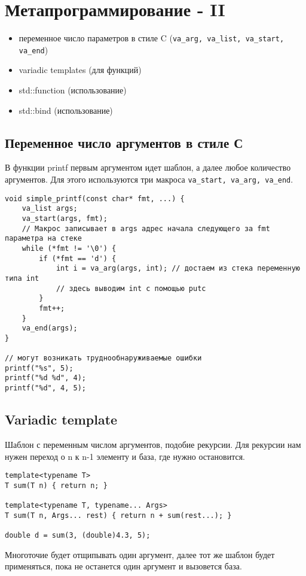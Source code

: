 \section{Метапрограммирование - II}
\begin{itemize}[noitemsep]
	\item переменное число параметров в стиле C (\texttt{va\_arg, va\_list, va\_start, va\_end})
	\item variadic templates (для функций)
	\item std::function (использование)
	\item std::bind (использование)
\end{itemize}

\subsection{Переменное число аргументов в стиле С}
В функции printf первым аргументом идет шаблон, а далее любое количество аргументов. 
Для этого используются три макроса \texttt{va\_start, va\_arg, va\_end}. 
\begin{verbatim}
void simple_printf(const char* fmt, ...) {
	va_list args;
	va_start(args, fmt); 
	// Макрос записывает в args адрес начала следующего за fmt параметра на стеке
	while (*fmt != '\0') {
		if (*fmt == 'd') {
			int i = va_arg(args, int); // достаем из стека переменную типа int
			// здесь выводим int с помощью putc
		}
		fmt++;
	}
	va_end(args);
}

// могут возникать труднообнаруживаемые ошибки
printf("%s", 5);
printf("%d %d", 4);
printf("%d", 4, 5);
\end{verbatim}

\subsection{Variadic template}
Шаблон с переменным числом аргументов, подобие рекурсии.
Для рекурсии нам нужен переход о n к n-1 элементу и база, где нужно остановится.
\begin{verbatim}
template<typename T>
T sum(T n) { return n; }

template<typename T, typename... Args>
T sum(T n, Args... rest) { return n + sum(rest...); }

double d = sum(3, (double)4.3, 5);
\end{verbatim}
Многоточие будет отщипывать один аргумент, далее тот же шаблон будет применяться, пока не останется один аргумент и вызовется база.

